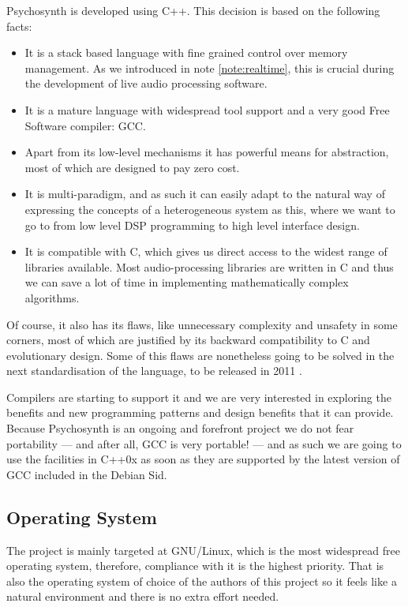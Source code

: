 Psychosynth is developed using C++. This decision is based on the
following facts:
\begin{itemize}
\item It is a stack based language with fine grained control over
  memory management. As we introduced in note \ref{note:realtime},
  this is crucial during the development of live audio processing
  software.

\item It is a mature language with widespread tool support and a very
  good Free Software compiler: GCC.

\item Apart from its low-level mechanisms it has powerful means for
  abstraction, most of which are designed to pay zero cost.

\item It is multi-paradigm, and as such it can easily adapt to the
  natural way of expressing the concepts of a heterogeneous system as
  this, where we want to go to from low level DSP programming to high
  level interface design.

\item It is compatible with C, which gives us direct access to the
  widest range of libraries available. Most audio-processing libraries
  are written in C and thus we can save a lot of time in
  implementing mathematically complex algorithms. 
\end{itemize}

Of course, it also has its flaws, like unnecessary complexity and
unsafety in some corners, most of which are justified by its backward
compatibility to C and evolutionary design. Some of this flaws are
nonetheless going to be solved in the next standardisation of the
language, to be released in 2011 \cite{herb10iso}.

Compilers are starting to support it and we are very interested in
exploring the benefits and new programming patterns and design
benefits that it can provide. Because Psychosynth is an ongoing and
forefront project we do not fear portability --- and after all, GCC is
very portable! --- and as such we are going to use the facilities in
C++0x as soon as they are supported by the latest version of GCC
included in the Debian Sid.

\subsection{Operating System}

The project is mainly targeted at GNU/Linux, which is the most
widespread free operating system, therefore, compliance with it is the
highest priority. That is also the operating system of choice of the
authors of this project so it feels like a natural environment and
there is no extra effort needed.

